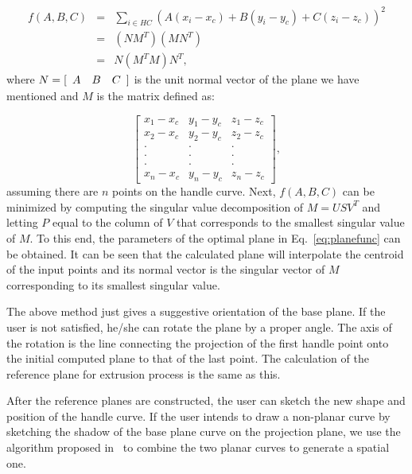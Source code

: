 \begin{eqnarray}
\label{eq:planeobjnew}
    f(A,B,C) &=& \sum\limits_{i \in HC} {(A(x_i-x_c)+B(y_i-y_c)+C(z_i-z_c))^2}\nonumber\\
    &=& (NM^T)(MN^T)\nonumber\\
    &=& N (M^TM) N^T,
\end{eqnarray}
where $N = [\begin{array}{*{20}c} A & B & C \end{array}]$
is the unit normal vector of the plane we have mentioned
and $M$ is the matrix defined as:

\begin{equation*}
\begin{bmatrix}
x_1-x_c & y_1-y_c & z_1-z_c\\[-1em]
x_2-x_c & y_2-y_c & z_2-z_c\\[-1em]
\cdot & \cdot & \cdot\\[-1em]
\cdot & \cdot & \cdot\\[-1em]
\cdot & \cdot & \cdot\\[-1em]
x_n-x_c & y_n-y_c & z_n-z_c
\end{bmatrix},
\end{equation*}
assuming there are $n$ points on the handle curve. Next, $f(A,B,C)$
can be minimized by computing the singular value decomposition
of $M=USV^T$ and letting $P$ equal to the column of $V$ 
that corresponds to the smallest singular value of $M$.
To this end, the parameters of the optimal plane in
Eq.~\ref{eq:planefunc} can be obtained. It can be seen that
the calculated plane will interpolate the centroid of the
input points and its normal vector is the singular vector
of $M$ corresponding to its smallest singular value.



The above method just gives a suggestive orientation of the base
plane. If the user is not satisfied, he/she can rotate the plane by
a proper angle. The axis of the rotation is the line connecting the
projection of the first handle point onto the initial computed plane
to that of the last point. The calculation of the reference plane
for extrusion process is the same as this.

After the reference planes are constructed, the user can sketch the
new shape and position of the handle curve. If the user intends to
draw a non-planar curve by sketching the shadow of the base plane
curve on the projection plane, we use the algorithm proposed
in~\cite{CMZHB99} to combine the two planar curves to generate a
spatial one.

